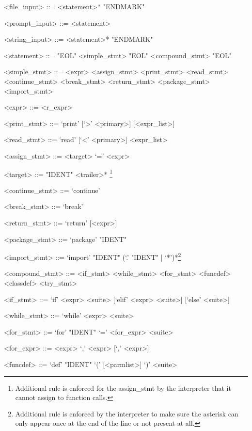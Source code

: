 \documentclass[10pt,a4paper]{article}
\begin{document}
\setlength{\grammarparsep}{10pt plus 1pt minus 1pt} %
\setlength{\grammarindent}{12em} %
\begin{grammar}


<file_input> ::= <statement>* "ENDMARK"

<prompt_input> ::= <statement>

<string_input> ::= <statement>* "ENDMARK"

<statement> ::= "EOL" 
    \alt <simple_stmt> "EOL"
    \alt <compound_stmt> "EOL"


<simple_stmt> ::= <expr>
	\alt <assign_stmt>                    
	\alt <print_stmt>
	\alt <read_stmt>
	\alt <continue_stmt>
	\alt <break_stmt>
	\alt <return_stmt>
	\alt <package_stmt>
	\alt <import_stmt>

<expr> ::= <r_expr>
	
<print_stmt> ::= `print' [`>' <primary>] [<expr_list>]

<read_stmt> ::= `read' [`<' <primary>] <expr_list>

<assign_stmt> ::= <target> `=' <expr>

<target> ::= "IDENT" <trailer>* \footnote{Additional rule is enforced for the
assign_stmt by the interpreter that it cannot assign to function calls.}

<continue_stmt> ::= `continue'

<break_stmt> ::= `break'

<return_stmt> ::= `return' [<expr>]

<package_stmt> ::= `package' "IDENT"

<import_stmt> ::= `import' "IDENT" (`.' "IDENT" | `*')*\footnote{
Additional rule is enforced by the interpreter to make sure the asterisk
can only appear once at the end of the line or not present at all.}

<compound_stmt> ::= <if_stmt>
	\alt <while_stmt>
	\alt <for_stmt>
	\alt <funcdef>
    \alt <classdef>
    \alt <try_stmt>

<if_stmt> ::= `if' <expr> <suite> [`elif' <expr> <suite>] [`else' <suite>]
              
<while_stmt> ::= `while' <expr> <suite>

<for_stmt> ::= `for' "IDENT" `=' <for_expr> <suite>

<for_expr> ::= <expr> `,' <expr> [`,' <expr>]

<funcdef> ::= `def' "IDENT" `(' [<parmlist>] `)' <suite>


\end{grammar}
\end{document}
